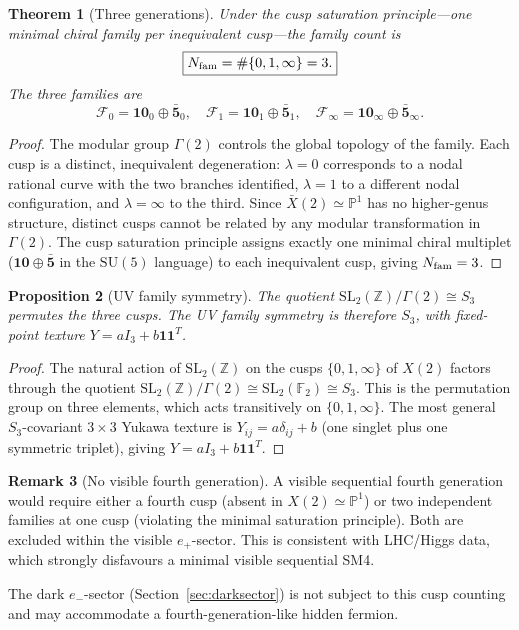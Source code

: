 \documentclass[12pt]{article}
\theoremstyle{plain}
\newtheorem{theorem}{Theorem}[section]
\newtheorem{proposition}[theorem]{Proposition}
\theoremstyle{definition}
\newtheorem{remark}[theorem]{Remark}
\numberwithin{equation}{section}
\begin{document}
\begin{theorem}[Three generations]\label{thm:threegen}
Under the cusp saturation principle---one minimal chiral family per
inequivalent cusp---the family count is
\[
\boxed{N_{\rm fam} = \#\{0,1,\infty\} = 3.}
\]
The three families are
\[
\mathcal{F}_0=\mathbf{10}_0\oplus\bar{\mathbf{5}}_0,\quad
\mathcal{F}_1=\mathbf{10}_1\oplus\bar{\mathbf{5}}_1,\quad
\mathcal{F}_\infty=\mathbf{10}_\infty\oplus\bar{\mathbf{5}}_\infty.
\]
\end{theorem}

\begin{proof}
The modular group $\Gamma(2)$ controls the global topology of the family.
Each cusp is a distinct, inequivalent degeneration: $\lambda=0$ corresponds to a nodal
rational curve with the two branches identified, $\lambda=1$ to a different nodal
configuration, and $\lambda=\infty$ to the third.  Since $\bar{X}(2)\simeq\mathbb{P}^1$
has no higher-genus structure, distinct cusps cannot be related by any modular transformation
in $\Gamma(2)$.  The cusp saturation principle assigns exactly one minimal chiral multiplet
($\mathbf{10}\oplus\bar{\mathbf{5}}$ in the $\mathrm{SU}(5)$ language) to each inequivalent cusp,
giving $N_{\rm fam}=3$.
\end{proof}

\begin{proposition}[UV family symmetry]
The quotient $\mathrm{SL}_2(\mathbb{Z})/\Gamma(2)\cong S_3$ permutes the
three cusps.  The UV family symmetry is therefore $S_3$, with fixed-point
texture $Y=aI_3+b\mathbf{1}\mathbf{1}^T$.
\end{proposition}

\begin{proof}
The natural action of $\mathrm{SL}_2(\mathbb{Z})$ on the cusps $\{0,1,\infty\}$ of $X(2)$
factors through the quotient $\mathrm{SL}_2(\mathbb{Z})/\Gamma(2)\cong\mathrm{SL}_2(\mathbb{F}_2)\cong S_3$.
This is the permutation group on three elements, which acts transitively on $\{0,1,\infty\}$.
The most general $S_3$-covariant $3\times3$ Yukawa texture is $Y_{ij}=a\delta_{ij}+b$ (one singlet plus one symmetric triplet), giving $Y=aI_3+b\mathbf{1}\mathbf{1}^T$.
\end{proof}

\begin{remark}[No visible fourth generation]
A visible sequential fourth generation would require either a fourth cusp
(absent in $X(2)\simeq\mathbb{P}^1$) or two independent families at one
cusp (violating the minimal saturation principle).  Both are excluded within
the visible $e_+$-sector.  This is consistent with LHC/Higgs data, which
strongly disfavours a minimal visible sequential SM4.

The dark $e_-$-sector (Section~\ref{sec:darksector}) is not subject to
this cusp counting and may accommodate a fourth-generation-like hidden
fermion.
\end{remark}
\end{document}

